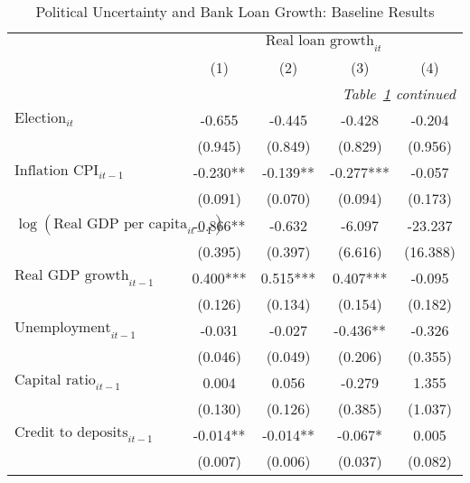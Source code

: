 \begin{longtable}{m{8cm}*{4}{c}}                                         \caption{Political Uncertainty and Bank Loan Growth: Baseline Results \label{baselineloans}}\\                                         \toprule                                         &\multicolumn{4}{c}{$\text{Real loan growth}_{it}$} \\ \cmidrule(lr){2-5}
                    &         (1)   &         (2)   &         (3)   &         (4)   \\
\midrule\endfirsthead                                         \multicolumn{5}{r}{\textit{Table~\ref{baselineloans} continued}} \\                                         \toprule\endhead\midrule\endfoot\endlastfoot
$\text{Election}_{it}$&      -0.655   &      -0.445   &      -0.428   &      -0.204   \\
                    &     (0.945)   &     (0.849)   &     (0.829)   &     (0.956)   \\
$\text{Inflation CPI}_{it-1}$&      -0.230** &      -0.139** &      -0.277***&      -0.057   \\
                    &     (0.091)   &     (0.070)   &     (0.094)   &     (0.173)   \\
$\log(\text{Real GDP per capita}_{it-1})$&      -0.866** &      -0.632   &      -6.097   &     -23.237   \\
                    &     (0.395)   &     (0.397)   &     (6.616)   &    (16.388)   \\
$\text{Real GDP growth}_{it-1}$&       0.400***&       0.515***&       0.407***&      -0.095   \\
                    &     (0.126)   &     (0.134)   &     (0.154)   &     (0.182)   \\
$\text{Unemployment}_{it-1}$&      -0.031   &      -0.027   &      -0.436** &      -0.326   \\
                    &     (0.046)   &     (0.049)   &     (0.206)   &     (0.355)   \\
$\text{Capital ratio}_{it-1}$&       0.004   &       0.056   &      -0.279   &       1.355   \\
                    &     (0.130)   &     (0.126)   &     (0.385)   &     (1.037)   \\
$\text{Credit to deposits}_{it-1}$&      -0.014** &      -0.014** &      -0.067*  &       0.005   \\
                    &     (0.007)   &     (0.006)   &     (0.037)   &     (0.082)   \\

\end{longtable}
